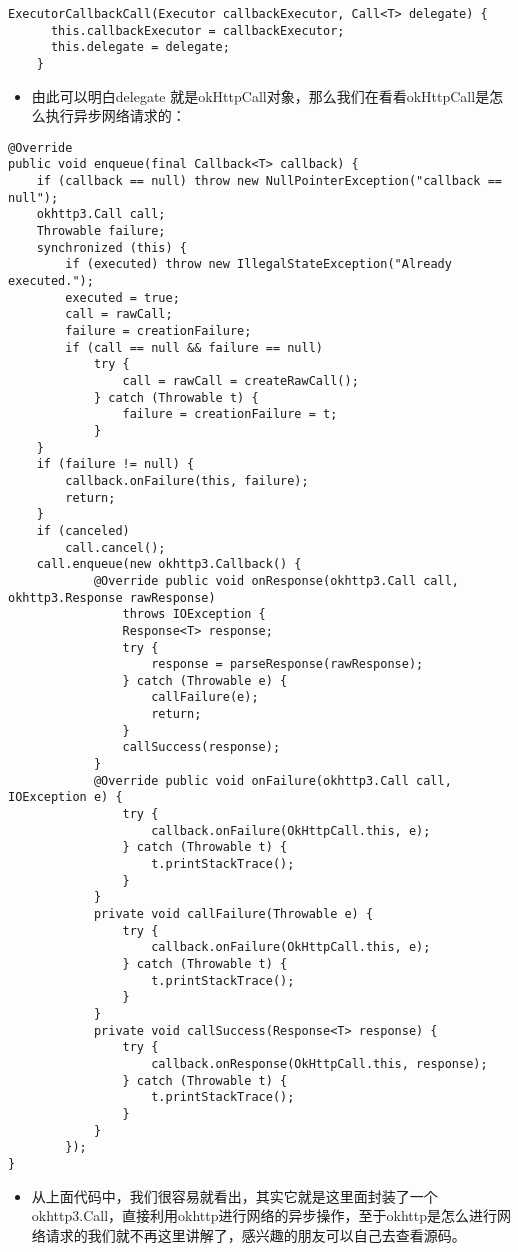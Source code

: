 \documentclass[9pt, b5paper]{article}
\begin{document}
\begin{verbatim}
ExecutorCallbackCall(Executor callbackExecutor, Call<T> delegate) {
      this.callbackExecutor = callbackExecutor;
      this.delegate = delegate;
    }
\end{verbatim}
\begin{itemize}
\item 由此可以明白delegate 就是okHttpCall对象，那么我们在看看okHttpCall是怎么执行异步网络请求的：
\end{itemize}
\begin{verbatim}
@Override 
public void enqueue(final Callback<T> callback) {
    if (callback == null) throw new NullPointerException("callback == null");
    okhttp3.Call call;
    Throwable failure;
    synchronized (this) {
        if (executed) throw new IllegalStateException("Already executed.");
        executed = true;
        call = rawCall;
        failure = creationFailure;
        if (call == null && failure == null) 
            try {
                call = rawCall = createRawCall();
            } catch (Throwable t) {
                failure = creationFailure = t;
            }
    }
    if (failure != null) {
        callback.onFailure(this, failure);
        return;
    }
    if (canceled) 
        call.cancel();
    call.enqueue(new okhttp3.Callback() {
            @Override public void onResponse(okhttp3.Call call, okhttp3.Response rawResponse)
                throws IOException {
                Response<T> response;
                try {
                    response = parseResponse(rawResponse);
                } catch (Throwable e) {
                    callFailure(e);
                    return;
                }
                callSuccess(response);
            }
            @Override public void onFailure(okhttp3.Call call, IOException e) {
                try {
                    callback.onFailure(OkHttpCall.this, e);
                } catch (Throwable t) {
                    t.printStackTrace();
                }
            }
            private void callFailure(Throwable e) {
                try {
                    callback.onFailure(OkHttpCall.this, e);
                } catch (Throwable t) {
                    t.printStackTrace();
                }
            }
            private void callSuccess(Response<T> response) {
                try {
                    callback.onResponse(OkHttpCall.this, response);
                } catch (Throwable t) {
                    t.printStackTrace();
                }
            }
        });
}
\end{verbatim}
\begin{itemize}
\item 从上面代码中，我们很容易就看出，其实它就是这里面封装了一个okhttp3.Call，直接利用okhttp进行网络的异步操作，至于okhttp是怎么进行网络请求的我们就不再这里讲解了，感兴趣的朋友可以自己去查看源码。
\end{itemize}
\end{document}
